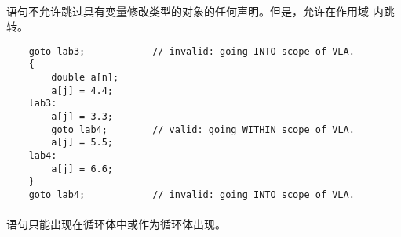 {\paragraph{}
\ex {}语句不允许跳过具有变量修改类型的对象的任何声明。但是，允许在作用域
内跳转。
\begin{lstlisting}
    goto lab3;            // invalid: going INTO scope of VLA.
    {
        double a[n];
        a[j] = 4.4;
    lab3:
        a[j] = 3.3;
        goto lab4;        // valid: going WITHIN scope of VLA.
        a[j] = 5.5;
    lab4:
        a[j] = 6.6;
    }
    goto lab4;            // invalid: going INTO scope of VLA.
\end{lstlisting}

\constraint
\paragraph{}
语句只能出现在循环体中或作为循环体出现。

\semantic
}
